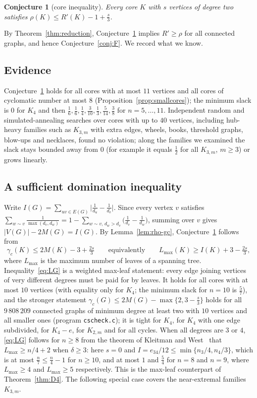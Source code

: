 \documentclass[11pt]{amsart}
\newtheorem{conjecture}[theorem]{Conjecture}
\theoremstyle{definition}
\newcommand{\Rp}{R'}
\begin{document}
\begin{conjecture}[core inequality]\label{conj:core}
Every core $K$ with $s$ vertices of degree two satisfies $\rho(K)\le\Rp(K)-1+\frac s3$.
\end{conjecture}

By Theorem~\ref{thm:reduction}, Conjecture~\ref{conj:core} implies $\Rp\ge\rho$ for all connected graphs, and hence
Conjecture~\ref{conj:F}. We record what we know.

\subsection{Evidence}
Conjecture~\ref{conj:core} holds for all cores with at most $11$ vertices and all cores of cyclomatic number at most
$8$ (Proposition~\ref{prop:smallcores}); the minimum slack is $0$ for $K_4$ and then $\frac16,\frac16,\frac14,\frac3{10},
\frac13,\frac5{14},\frac38$ for $n=5,\dots,11$. Independent random and simulated-annealing searches over cores with up to
$40$ vertices, including hub-heavy families such as $K_{3,m}$ with extra edges, wheels, books, threshold graphs,
blow-ups and necklaces, found no violation; along the families we examined the slack stays bounded away from $0$
(for example it equals $\frac12$ for all $K_{3,m}$, $m\ge3$) or grows linearly.

\subsection{A sufficient domination inequality}
Write $I(G)=\sum_{uv\in E(G)}\bigl|\frac1{d_u}-\frac1{d_v}\bigr|$. Since every vertex $v$ satisfies
$\sum_{w\sim v}\frac1{\max(d_v,d_w)}=1-\sum_{w\sim v,\,d_w>d_v}\bigl(\frac1{d_v}-\frac1{d_w}\bigr)$, summing over $v$ gives
$|V(G)|-2M(G)=I(G)$. By Lemma~\ref{lem:rho-gc}, Conjecture~\ref{conj:core} follows from
\begin{equation}\label{eq:LG}
\gamma_c(K)\le 2M(K)-3+\tfrac{2s}{3}\qquad\text{equivalently}\qquad L_{\max}(K)\ge I(K)+3-\tfrac{2s}3,
\end{equation}
where $L_{\max}$ is the maximum number of leaves of a spanning tree. Inequality~\eqref{eq:LG} is a weighted max-leaf
statement: every edge joining vertices of very different degrees must be paid for by leaves. It holds for all cores
with at most $10$ vertices (with equality only for $K_4$; the minimum slack for $n=10$ is $\frac57$), and the stronger
statement $\gamma_c(G)\le2M(G)-\max\{2,3-\frac s3\}$ holds for all $9\,808\,209$ connected graphs of minimum degree at
least two with $10$ vertices and all smaller ones (program \texttt{cscheck.c}); it is tight for $K_4$, for $K_4$ with
one edge subdivided, for $K_4-e$, for $K_{2,m}$ and for all cycles. When all degrees are $3$ or $4$, \eqref{eq:LG} follows for $n\ge8$ from the
theorem of Kleitman and West~\cite{KleitmanWest} that $L_{\max}\ge n/4+2$ when $\delta\ge3$: here $s=0$ and
$I=e_{34}/12\le\min\{n_3/4,n_4/3\}$, which is at most $\frac n7\le\frac n4-1$ for $n\ge10$, and at most $1$ and
$\frac54$ for $n=8$ and $n=9$, where $L_{\max}\ge4$ and $L_{\max}\ge5$ respectively. This is the max-leaf
counterpart of Theorem~\ref{thm:D4}. The following special
case covers the near-extremal families $K_{3,m}$.
\end{document}
